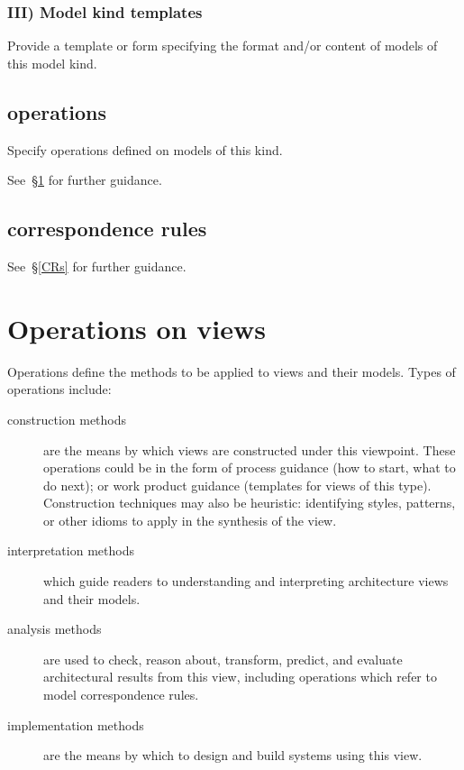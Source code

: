 \subsubsection{III) Model kind templates \Optional}

Provide a template or form specifying the format and/or content of
models of this model kind.



\subsection{ operations \Optional} 

Specify operations defined on models of this kind.

See~\S\ref{Opns} for further guidance.


\subsection{ correspondence rules}


See~\S\ref{CRs} for further guidance.


\section{Operations on views}\label{Opns}

Operations define the methods to be applied to views and their models.
Types of operations include:

\begin{description}

\item[construction methods] are the means by which views are
  constructed under this viewpoint. These operations could be in the
  form of process guidance (how to start, what to do next); or work
  product guidance (templates for views of this type). Construction
  techniques may also be heuristic: identifying styles, patterns, or
  other idioms to apply in the synthesis of the view.

\item[interpretation methods] which guide readers to understanding
  and interpreting architecture views and their models.

\item[analysis methods] are used to check, reason about, transform,
  predict, and evaluate architectural results from this view,
  including operations which refer to model correspondence rules.

\item[implementation methods] are the means by which to design and
  build systems using this view.

\end{description}

